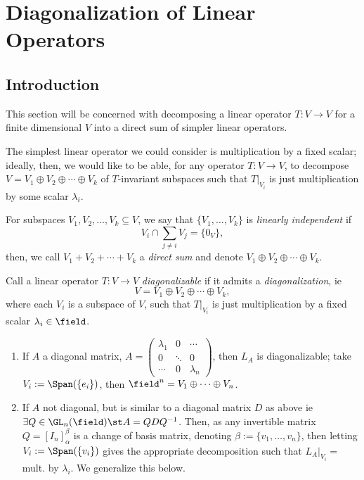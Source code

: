\section{Diagonalization of Linear Operators}

\subsection{Introduction}

This section will be concerned with decomposing a linear operator $T : V \to V$ for a finite dimensional $V$ into a direct sum of simpler linear operators.

The simplest linear operator we could consider is multiplication by a fixed scalar; ideally, then, we would like to be able, for any operator $T : V \to V$, to decompose $V = V_1 \oplus V_2 \oplus \cdots \oplus V_k$ of $T$-invariant subspaces such that $T|_{V_{i}}$ is just multiplication by some scalar $\lambda_i$.


\begin{definition}
    For subspaces $V_1, V_2, \dots, V_k \subseteq V$, we say that $\{V_1, \dots, V_k\}$ is \emph{linearly independent} if $$V_i \cap \sum_{j \neq i} V_j = \{0_V\},$$ then, we call $V_1 + V_2 + \cdots + V_k$ a \emph{direct sum} and denote $V_1 \oplus V_2 \oplus \cdots \oplus V_k$.
\end{definition}

\begin{definition}[Diagonalization]
    Call a linear operator $T : V\to V$ \emph{diagonalizable} if it admits a \emph{diagonalization}, ie \[
    V = V_1 \oplus V_2 \oplus \cdots \oplus V_k,    
    \]
    where each $V_i$ is a subspace of $V$, such that $T\vert_{V_i}$ is just multiplication by a fixed scalar $\lambda_i \in \field$.
\end{definition}

\begin{example}
    \begin{enumerate}
        \item If $A$ a diagonal matrix, $A = \begin{pmatrix}
            \lambda_1 & 0 & \cdots\\
            0 & \ddots & 0\\
            \cdots & 0 & \lambda_n
        \end{pmatrix}$, then $L_A$ is diagonalizable; take $V_i := \Span(\{e_i\})$, then $\field^n = V_1 \oplus \cdots \oplus V_n$.
        \item If $A$ not diagonal, but is similar to a diagonal matrix $D$ as above ie $\exists Q \in \GL_n(\field)\st A = Q D Q^{-1}$. Then, as any invertible matrix $Q = [I_n]_\alpha^\beta$ is a change of basis matrix, denoting $\beta := \{v_1, \dots, v_n\}$, then letting $V_i := \Span (\{v_i\})$ gives the appropriate decomposition such that $L_A \vert_{V_i} = $ mult. by $\lambda_i$. We generalize this below.
    \end{enumerate}
\end{example}

